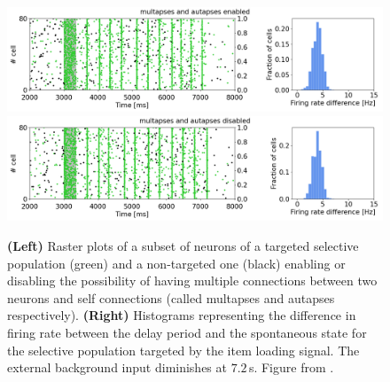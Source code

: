 \documentclass[a4paper, 12pt, twoside, openright]{book}
\begin{document}
\begin{figure}[h]
    \centering
    \includegraphics[width=0.9\columnwidth]{figures/fig2_siM_siA.png}
    \includegraphics[width=0.9\columnwidth]{figures/fig2_noM_noA.png}
    \caption{\textbf{(Left)} Raster plots of a subset of neurons of a targeted selective population (green) and a non-targeted one (black) enabling or disabling the possibility of having multiple connections between two neurons and self connections (called multapses and autapses respectively). \textbf{(Right)} Histograms representing the difference in firing rate between the delay period and the spontaneous state for the selective population targeted by the item loading signal. The external background input diminishes at $7.2$\,s. Figure from \cite{Tiddia2022_WM}.}
    \label{fig:figure2b_different_connectivity}
\end{figure}
\end{document}
